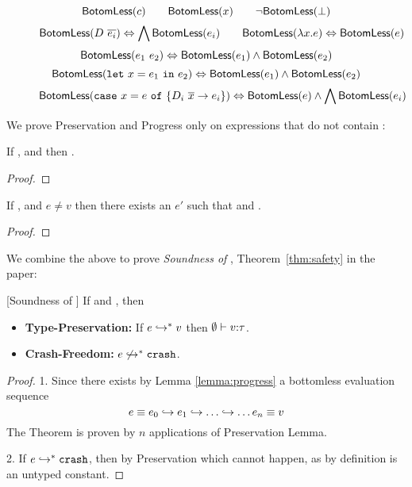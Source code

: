 \begin{figure*}[t!]
$$
\botomless{c} \qquad\botomless{x} \qquad \lnot \botomless{\ebot}
$$
$$
\botomless{D\ \overline{e_i}} \Leftrightarrow \bigwedge\botomless{e_i} \qquad
\botomless {\efun{x}{}{e}} \Leftrightarrow \botomless{e}
$$
$$
\botomless {e_1 \ e_2} \Leftrightarrow \botomless{e_1} \land \botomless{e_2} 
$$
$$
\botomless {\elet{x}{e_1}{e_2}} \Leftrightarrow \botomless{e_1} \land \botomless{e_2}
$$
$$
\botomless {\ecase{e}{D_i}{\overline{x}}{e_i}{x}} \Leftrightarrow \botomless{e} \land \bigwedge\botomless{e_i}
$$
\caption{}
\label{fig:proofs:botomless}
\end{figure*}
We prove Preservation and Progress only on expressions that do not contain \ebot:
%
\begin{lemma}[Preservation]\label{lemma:preservation}
If ,  and  then .
\end{lemma}
\begin{proof}

\end{proof}
\begin{lemma}[Progress]\label{lemma:progress}
If ,  and $e \neq v$ 
then there exists an $e'$ such that  and .
\end{lemma}
\begin{proof}

\end{proof}

We combine the above to prove 
\textit{Soundness of \undeclang}, \ie Theorem~\ref{thm:safety} in the paper:
%
\begin{theorem}{[Soundness of \undeclang]}\label{thm:proofs:safety}
If  and , then 
\begin{itemize}
\item\textbf{Type-Preservation:} If 
       $\evals{e}{v}$ then $\hastypet{\emptyset}{v}{\typ}$.
\item\textbf{Crash-Freedom:} $\evals{e\not}{\ecrash}$.
\end{itemize}
\end{theorem}
\begin{proof}
1. 
Since  there exists by Lemma \ref{lemma:progress} a bottomless evaluation sequence 
$$
e \equiv e_0 \eval{}{} e_1 \eval{}{} \dots \eval{}{} \dots e_n \equiv v
$$
The Theorem is proven by $n$ applications of Preservation Lemma.

2. If $\evals{e}{\CRASH}$, then by Preservation \hastype{\emptyset}{\CRASH}{\tau}
which cannot happen, as \CRASH by definition is an untyped constant.
\end{proof}
